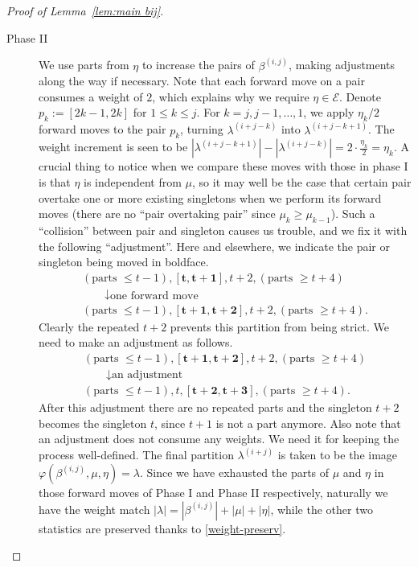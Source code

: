 \documentclass[11pt,reqno]{amsart}
\numberwithin{equation}{section}
\theoremstyle{plain}
\theoremstyle{definition}
\def\E{\mathcal{E}}
\def\la{\lambda}
\begin{document}
\begin{proof}[Proof of Lemma~\ref{lem:main bij}]
\begin{description}
  \item[Phase II] We use parts from $\eta$ to increase the pairs of $\beta^{(i,j)}$, making adjustments along the way if necessary. Note that each forward move on a pair consumes a weight of $2$, which explains why we require $\eta\in\E$. Denote $p_k:=[2k-1,2k]$ for $1\le k\le j$. For $k=j,j-1,\ldots,1$, we apply $\eta_k/2$ forward moves to the pair $p_k$, turning $\la^{(i+j-k)}$ into $\la^{(i+j-k+1)}$. The weight increment is seen to be $|\la^{(i+j-k+1)}|-|\la^{(i+j-k)}|=2\cdot\frac{\eta_k}{2}=\eta_k$. A crucial thing to notice when we compare these moves with those in phase I is that $\eta$ is independent from $\mu$, so it may well be the case that certain pair overtake one or more existing singletons when we perform its forward moves (there are no ``pair overtaking pair'' since $\mu_k\ge \mu_{k-1}$). Such a ``collision'' between pair and singleton causes us trouble, and we fix it with the following ``adjustment''. Here and elsewhere, we indicate the pair or singleton being moved in boldface.
  $$
  \begin{gathered}
  (\text{parts $\leq t-1$}),[ \mathbf{t}, \mathbf{t+1}], t+2, (\text{parts $\geq t+4$}) \\
  \qquad \downarrow \text {one forward move } \\
  (\text{parts $\leq t-1$}),[\mathbf{t+1}, \mathbf{t+2}], t+2, (\text{parts $\geq t+4$}).
  \end{gathered}
  $$
  Clearly the repeated $t+2$ prevents this partition from being strict. We need to make an adjustment as follows.
  $$
  \begin{gathered}
   (\text{parts $\leq t-1$}),[\mathbf{t+1}, \mathbf{t+2}], t+2, (\text{parts $\geq t+4$}) \\
  \qquad \downarrow \text {an adjustment } \\
  (\text{parts $\leq t-1$}),t, [\mathbf{t+2}, \mathbf{t+3}], (\text{parts $\geq t+4$}).
  \end{gathered}
  $$
  After this adjustment there are no repeated parts and the singleton $t+2$ becomes the singleton $t$, since $t+1$ is not a part anymore. Also note that an adjustment does not consume any weights. We need it for keeping the process well-defined. The final partition $\la^{(i+j)}$ is taken to be the image $\varphi(\beta^{(i,j)},\mu,\eta)=\la$. Since we have exhausted the parts of $\mu$ and $\eta$ in those forward moves of Phase I and Phase II respectively, naturally we have the weight match $|\la|=|\beta^{(i,j)}|+|\mu|+|\eta|$, while the other two statistics are preserved thanks to \eqref{weight-preserv}.
\end{description}


\end{proof}
\end{document}

